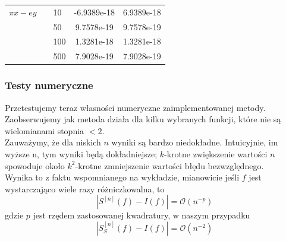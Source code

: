 \documentclass[9pt]{beamer}
\begin{document}
\begin{frame}
\begin{table}[]
{\begin{tabular}{|l|S|l|S|S|}
$ \pi x - ey $         &             & 10  & -6.9389e-18 & 6.9389e-18 \\%
                       &             & 50  &  9.7578e-19 & 9.7578e-19 \\%
                       &             & 100 &  1.3281e-18 & 1.3281e-18 \\%
                       &             & 500 &  7.9028e-19 & 7.9028e-19 \\%
				\hline
			\end{tabular}
		}
	\end{table}
\end{frame}

\begin{frame}
	\frametitle{Testy numeryczne}
	\begin{spacing}{1.25}
		Przetestujemy teraz własności numeryczne zaimplementowanej metody. 
		Zaobserwujemy jak metoda działa dla kilku wybranych funkcji, które nie są wielomianami stopnia $ < 2 $.\\
		Zauważymy, że dla niskich $n$ wyniki są bardzo niedokładne. Intuicyjnie, im wyższe n, tym wyniki będą dokładniejsze; $k$-krotne zwiększenie wartości $n$ spowoduje około $k^2$-krotne zmniejszenie wartości błędu bezwzględnego.\\
		Wynika to z faktu wspomnianego na wykładzie, mianowicie jeśli $f$ jest wystarczająco wiele razy różniczkowalna, to 
		$$ | S^{[n]}(f) - I(f) | = \mathcal{O}(n^{-p})$$
		gdzie $p$ jest rzędem zastosowanej kwadratury, w naszym przypadku 
		$$ | S_S^{[n]}(f) - I(f) | = \mathcal{O}(n^{-2}) $$
	\end{spacing}
\end{frame}
\end{document}
